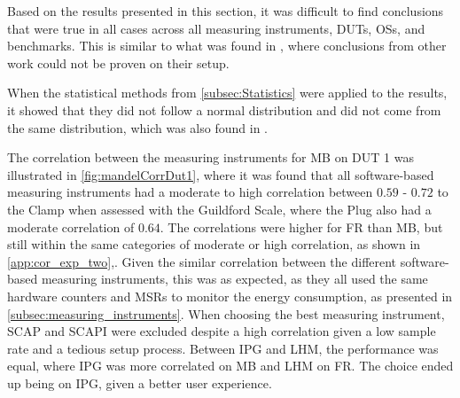 Based on the results presented in this section, it was difficult to find conclusions that were true in all cases across all measuring instruments, DUTs, OSs, and benchmarks. This is similar to what was found in \cite{Ournani2020}, where conclusions from other work could not be proven on their setup.







When the statistical methods from \cref{subsec:Statistics} were applied to the results, it showed that they did not follow a normal distribution and did not come from the same distribution, which was also found in \cite{biksbois, Koedijk2022diff}.%


The correlation between the measuring instruments for MB on DUT 1 was illustrated in \cref{fig:mandelCorrDut1}, where it was found that all software-based measuring instruments had a moderate to high correlation between $0.59$ - $0.72$ to the Clamp when assessed with the Guildford Scale, where the Plug also had a moderate correlation of $0.64$. The correlations were higher for FR than MB, but still within the same categories of moderate or high correlation, as shown in \cref{app:cor_exp_two},. Given the similar correlation between the different software-based measuring instruments, this was as expected, as they all used the same hardware counters and MSRs to monitor the energy consumption, as presented in \cref{subsec:measuring_instruments}. When choosing the best measuring instrument, SCAP and SCAPI were excluded despite a high correlation given a low sample rate and a tedious setup process. Between IPG and LHM, the performance was equal, where IPG was more correlated on MB and LHM on FR. The choice ended up being on IPG, given a better user experience. 


